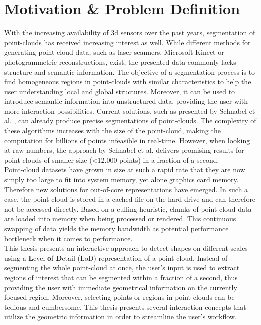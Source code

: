 \section{Motivation \& Problem Definition}

With the increasing availability of 3d sensors over the past years, segmentation of point-clouds has received increasing interest as well. While different methods for generating point-cloud data, such as laser scanners, Microsoft Kinect or photogrammetric reconstructions, exist, the presented data commonly lacks structure and semantic information. The objective of a segmentation process is to find homogeneous regions in point-clouds with similar characteristics to help the user understanding local and global structures. Moreover, it can be used to introduce semantic information into unstructured data, providing the user with more interaction possibilities. Current solutions, such as presented by Schnabel et al. \cite{schnabel-2007-efficient}\cite{schnabel-2007-ransac}, can already produce precise segmentations of point-clouds. The complexity of these algorithms increases with the size of the point-cloud, making the computation for billions of points infeasible in real-time. However, when looking at raw numbers, the approach by Schnabel et al. \cite{schnabel-2007-ransac} delivers promising results for point-clouds of smaller size (\textless 12.000 points) in a fraction of a second. 
\\
Point-cloud datasets have grown in size at such a rapid rate that they are now simply too large to fit into system memory, yet alone graphics card memory. Therefore new solutions for out-of-core representations have emerged. In such a case, the point-cloud is stored in a cached file on the hard drive and can therefore not be accessed directly. Based on a culling heuristic, chunks of point-cloud data are loaded into memory when being processed or rendered. This continuous swapping of data yields the memory bandwidth as potential performance bottleneck when it comes to performance.
\\
This thesis presents an interactive approach to detect shapes on different scales using a \textbf{L}evel-\textbf{o}f-\textbf{D}etail (LoD) representation of a point-cloud. Instead of segmenting the whole point-cloud at once, the user's input is used to extract regions of interest that can be segmented within a fraction of a second, thus providing the user with immediate geometrical information on the currently focused region. Moreover, selecting points or regions in point-clouds can be tedious and cumbersome. This thesis presents several interaction concepts that utilize the geometric information in order to streamline the user's workflow. 